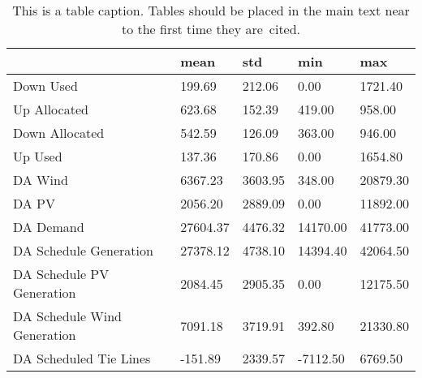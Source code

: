 \begin{table}[H] 
    \caption{This is a table caption. Tables should be placed in the main text near to the first time they are~cited.\label{tab1}}
    \begin{tabularx}{\textwidth}{CCCCC}
    \toprule
    & \textbf{mean}	& \textbf{std}	& \textbf{min} & \textbf{max}\\
    \midrule
    Down Used & 199.69 & 212.06 & 0.00 & 1721.40 \\
    Up Allocated & 623.68 & 152.39 & 419.00 & 958.00 \\
    Down Allocated & 542.59 & 126.09 & 363.00 & 946.00 \\
    Up Used & 137.36 & 170.86 & 0.00 & 1654.80 \\
    DA Wind & 6367.23 & 3603.95 & 348.00 & 20879.30 \\
    DA PV & 2056.20 & 2889.09 & 0.00 & 11892.00 \\
    DA Demand & 27604.37 & 4476.32 & 14170.00 & 41773.00 \\
    DA Schedule Generation & 27378.12 & 4738.10 & 14394.40 & 42064.50 \\
    DA Schedule PV Generation & 2084.45 & 2905.35 & 0.00 & 12175.50 \\
    DA Schedule Wind Generation & 7091.18 & 3719.91 & 392.80 & 21330.80 \\
    DA Scheduled Tie Lines & -151.89 & 2339.57 & -7112.50 & 6769.50 \\
    \bottomrule
    \end{tabularx}
\end{table}